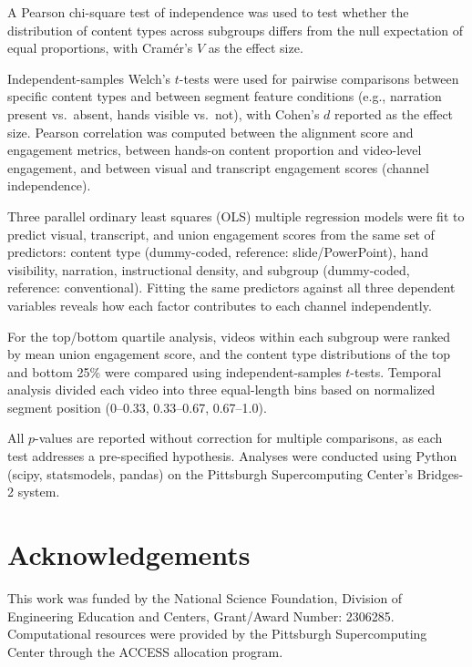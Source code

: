 \documentclass[fleqn,10pt]{wlscirep}
\begin{document}
A Pearson chi-square test of independence was used to test whether the distribution of content types across subgroups differs from the null expectation of equal proportions, with Cram\'{e}r's $V$ as the effect size.

Independent-samples Welch's $t$-tests were used for pairwise comparisons between specific content types and between segment feature conditions (e.g., narration present vs.\ absent, hands visible vs.\ not), with Cohen's $d$ reported as the effect size. Pearson correlation was computed between the alignment score and engagement metrics, between hands-on content proportion and video-level engagement, and between visual and transcript engagement scores (channel independence).

Three parallel ordinary least squares (OLS) multiple regression models were fit to predict visual, transcript, and union engagement scores from the same set of predictors: content type (dummy-coded, reference: slide/PowerPoint), hand visibility, narration, instructional density, and subgroup (dummy-coded, reference: conventional). Fitting the same predictors against all three dependent variables reveals how each factor contributes to each channel independently.

For the top/bottom quartile analysis, videos within each subgroup were ranked by mean union engagement score, and the content type distributions of the top and bottom 25\% were compared using independent-samples $t$-tests. Temporal analysis divided each video into three equal-length bins based on normalized segment position (0--0.33, 0.33--0.67, 0.67--1.0).

All $p$-values are reported without correction for multiple comparisons, as each test addresses a pre-specified hypothesis. Analyses were conducted using Python (scipy, statsmodels, pandas) on the Pittsburgh Supercomputing Center's Bridges-2 system.





\section*{Acknowledgements}

This work was funded by the National Science Foundation, Division of Engineering Education and Centers, Grant/Award Number: 2306285. Computational resources were provided by the Pittsburgh Supercomputing Center through the ACCESS allocation program.
\end{document}
